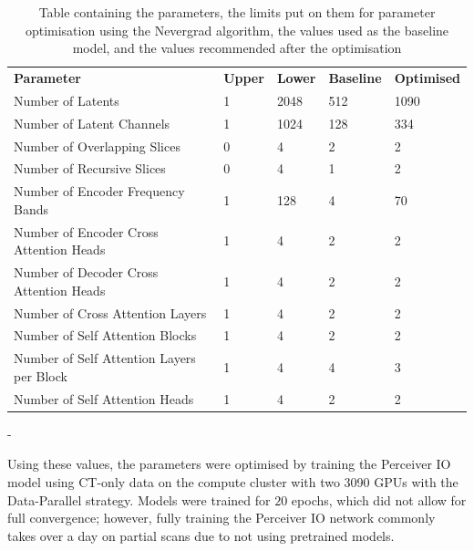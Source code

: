 \documentclass{l4proj}
\begin{document}
\begin{table}[] 
\caption{Table containing the parameters, the limits put on them for parameter optimisation using the Nevergrad algorithm, the values used as the baseline model, and the values recommended after the optimisation} \label{tab:parameter_limits}
\begin{tabular}{lllll}
\textbf{Parameter}                        & \textbf{Upper} & \textbf{Lower} & \textbf{Baseline} & \textbf{Optimised} \\
Number of Latents                         & 1              & 2048           & 512               & 1090               \\
Number of Latent Channels                 & 1              & 1024           & 128               & 334                \\
Number of Overlapping Slices             & 0              & 4              & 2                 & 2                  \\
Number of Recursive Slices                & 0              & 4              & 1                 & 2                  \\
Number of Encoder Frequency Bands         & 1              & 128            & 4                 & 70                 \\
Number of Encoder Cross Attention Heads   & 1              & 4              & 2                 & 2                  \\
Number of Decoder Cross Attention Heads   & 1              & 4              & 2                 & 2                  \\
Number of Cross Attention Layers          & 1              & 4              & 2                 & 2                  \\
Number of Self Attention Blocks           & 1              & 4              & 2                 & 2                  \\
Number of Self Attention Layers per Block & 1              & 4              & 4                 & 3                  \\
Number of Self Attention Heads            & 1              & 4              & 2                 & 2                 
\end{tabular}-
\end{table}

Using these values, the parameters were optimised by training the Perceiver IO model using CT-only data on the compute cluster with two 3090 GPUs with the Data-Parallel strategy. Models were trained for $20$ epochs, which did not allow for full convergence; however, fully training the Perceiver IO network commonly takes over a day on partial scans due to not using pretrained models.
\end{document}
